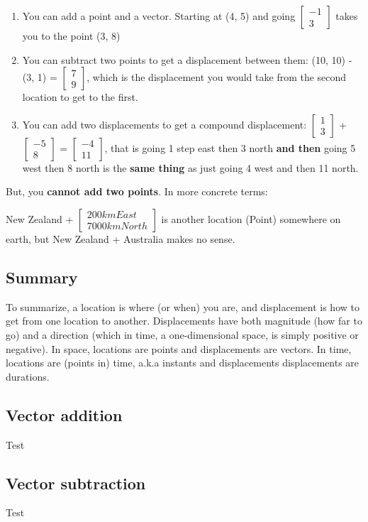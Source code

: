 \documentclass{article}
\begin{document}
\begin{enumerate}
    \item You can add a point and a vector. Starting at (4, 5) and going $\begin{bmatrix} -1 \\ 3 \end{bmatrix}$ takes you to the point (3, 8)
    \item You can subtract two points to get a displacement between them: (10, 10) - (3, 1) = $\begin{bmatrix} 7 \\ 9 \end{bmatrix}$, which is the displacement you would take from the second location to get to the first.
    \item You can add two displacements to get a compound displacement: $\begin{bmatrix} 1 \\ 3 \end{bmatrix}$ + $\begin{bmatrix} -5 \\ 8 \end{bmatrix}$ = $\begin{bmatrix} -4 \\ 11 \end{bmatrix}$, that is going 1 step east then 3 north \textbf{and then} going 5 west then 8 north is the \textbf{same thing} as just going 4 west and then 11 north.
\end{enumerate}

But, you \textbf{cannot add two points}. In more concrete terms:

New Zealand + $\begin{bmatrix} 200km East \\ 7000km North \end{bmatrix}$ is another location (Point) somewhere on earth, but New Zealand + Australia makes no sense.


\begin{center}
    \section{Summary}    
\end{center}

To summarize, a location is where (or when) you are, and displacement is how to get from one location to another. Displacements have both magnitude (how far to go) and a direction (which in time, a one-dimensional space, is simply positive or negative). In space, locations are points and displacements are vectors. In time, locations are (points in) time, a.k.a instants and displacements displacements are durations.

\begin{center}
    \section{Vector addition}    
\end{center}

Test

\begin{center}
    \section{Vector subtraction}    
\end{center}

Test
\end{document}
